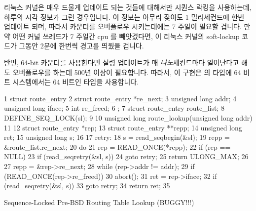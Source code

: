 {	리눅스 커널은 매우 드물게 업데이트 되는 것들에 대해서만 시퀀스 락킹을
	사용하는데, 하루의 시각 정보가 그런 경우입니다.
	이 정보는 아무리 잦아도 1 밀리세컨드에 한번 업데이트 되며, 따라서
	카운터를 오버플로우 시키는데에는 7 주일이 필요할 겁니다.
	만약 어떤 커널 쓰레드가 7 주일간 cpu 를 빼앗겼다면, 이 리눅스 커널의
	soft-lockup 코드가 그동안 2분에 한번씩 경고를 띄웠을 겁니다.

	반면, 64-bit 카운터를 사용한다면 설령 업데이트가 매
	\emph{나노}세컨드마다 일어난다고 해도 오버플로우를 하는데 500년 이상이
	필요합니다.
	따라서, 이 구현은  의 타입에 64 비트 시스템에서는 64 비트인
	타입을 사용합니다.

} \QuickQuizEnd

\begin{listing}[tbp]
{ \scriptsize
\begin{verbbox}
 1 struct route_entry {
 2   struct route_entry *re_next;
 3   unsigned long addr;
 4   unsigned long iface;
 5   int re_freed;
 6 };
 7 struct route_entry route_list;
 8 DEFINE_SEQ_LOCK(sl);
 9
10 unsigned long route_lookup(unsigned long addr)
11 {
12   struct route_entry *rep;
13   struct route_entry **repp;
14   unsigned long ret;
15   unsigned long s;
16
17 retry:
18   s = read_seqbegin(&sl);
19   repp = &route_list.re_next;
20   do {
21     rep = READ_ONCE(*repp);
22     if (rep == NULL) {
23       if (read_seqretry(&sl, s))
24         goto retry;
25       return ULONG_MAX;
26     }
27     repp = &rep->re_next;
28   } while (rep->addr != addr);
29   if (READ_ONCE(rep->re_freed))
30     abort();
31   ret = rep->iface;
32   if (read_seqretry(&sl, s))
33     goto retry;
34   return ret;
35 }
\end{verbbox}
}
\centering
\theverbbox
\caption{Sequence-Locked Pre-BSD Routing Table Lookup (BUGGY!!!)}
\label{lst:defer:Sequence-Locked Pre-BSD Routing Table Lookup}
\end{listing}

